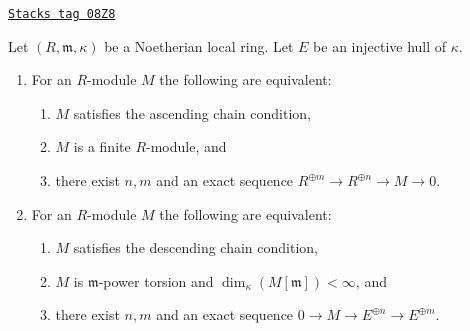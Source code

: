 \begin{lemma}
\label{dualizing-lemma-describe-categories}
\href{https://stacks.math.columbia.edu/tag/08Z8}{\texttt{Stacks tag 08Z8}}

Let $(R, \mathfrak m, \kappa)$ be a Noetherian local ring.
Let $E$ be an injective hull of $\kappa$.
\begin{enumerate}
\item For an $R$-module $M$ the following are equivalent:
\begin{enumerate}
\item $M$ satisfies the ascending chain condition,
\item $M$ is a finite $R$-module, and
\item there exist $n, m$ and an exact sequence
$R^{\oplus m} \to R^{\oplus n} \to M \to 0$.
\end{enumerate}
\item For an $R$-module $M$ the following are equivalent:
\begin{enumerate}
\item $M$ satisfies the descending chain condition,
\item $M$ is $\mathfrak m$-power torsion and
$\dim_\kappa(M[\mathfrak m]) < \infty$, and
\item there exist $n, m$ and an exact sequence
$0 \to M \to E^{\oplus n} \to E^{\oplus m}$.
\end{enumerate}
\end{enumerate}
\end{lemma}

